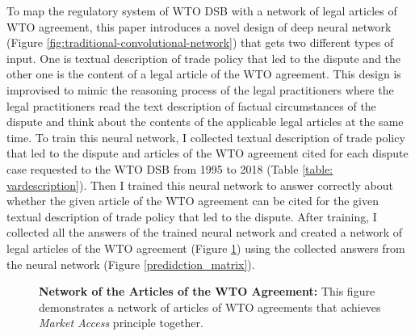 To map the regulatory system of WTO DSB with 
a network of legal articles of WTO agreement,
this paper introduces a novel design of deep neural network (Figure \ref{fig:traditional-convolutional-network}) that
gets two different types of input.
One is textual description of trade policy that led to the dispute and
the other one is the content of a legal article of the WTO agreement.
This design is improvised to mimic
the reasoning process of the legal practitioners
where the legal practitioners read
the text description of
factual circumstances of the dispute and think about the contents of
the applicable legal articles at the same time.
To train this neural network, I collected textual description of trade policy 
that led to the dispute and articles of the WTO agreement cited for each dispute
case requested to the WTO DSB 
from 1995 to 2018 (Table \ref{table: vardescription}).
Then I trained this neural network to answer correctly 
about whether the given article of the WTO agreement
can be cited for the given textual description of 
trade policy that led to the dispute.
After training, I collected all the answers of the trained neural network 
and created a network of legal articles of the WTO agreement (Figure \ref{fig:market-aceess_directed}) using 
the collected answers from the neural network (Figure \ref{predidction_matrix}).


\begin{figure}
    \centering{
      
    }
    \caption{{\bf Network of the Articles of the WTO Agreement:} 
    This figure demonstrates a network of articles of WTO agreements
    that achieves \textit{Market Access} principle together.
    }
    \label{fig:market-aceess_directed}
  \end{figure}
  






